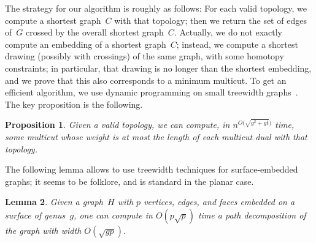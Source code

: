 \documentclass[11pt]{article}
\theoremstyle{plain}  \newtheorem{theorem}{Theorem}[section]
\newtheorem{lemma}[theorem]{Lemma}
\newtheorem{proposition}[theorem]{Proposition}
\theoremstyle{definition}
\begin{document}
The strategy for our algorithm is roughly as follows: For each valid
topology, we compute a shortest graph~$C$ with that topology; then we
return the set of edges of~$G$ crossed by the overall shortest graph~$C$.
Actually, we do not exactly compute an embedding of a shortest graph~$C$;
instead, we compute a shortest drawing (possibly with crossings) of the
same graph, with some homotopy constraints; in particular, that drawing is
no longer than the shortest embedding, and we prove that this also
corresponds to a minimum multicut.  To get an efficient algorithm, we use
dynamic programming on small treewidth graphs~\cite{b-dpgbt-88}.  The key
proposition is the following.
\begin{proposition}\label{P:enumvert}
  Given a valid topology, we can compute, in
  $n^{O\big(\sqrt{g^2+gt}\big)}$ time, some multicut whose
  weight is at most the length of each multicut dual with that topology.
\end{proposition}
The following lemma allows to use treewidth techniques for surface-embedded
graphs; it seems to be folklore, and is standard in the planar case.
\begin{lemma}\label{L:treewidth}
  Given a graph~$H$ with $p$ vertices, edges, and faces embedded on a
  surface of genus~$g$, one can compute in $O(p\sqrt p)$ time a path
  decomposition of the graph with width $O(\sqrt{gp})$.
\end{lemma}
\end{document}

